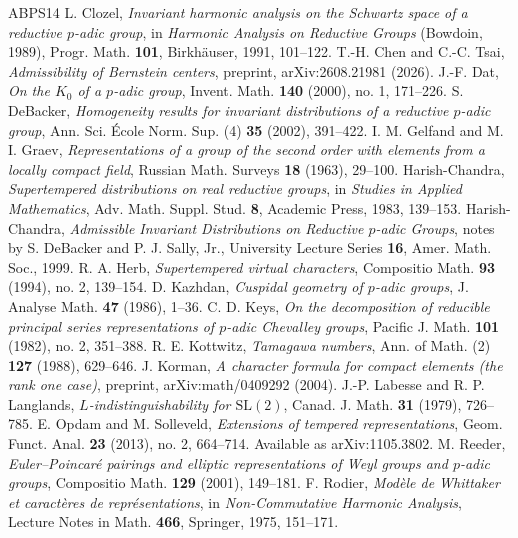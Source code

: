 \documentclass[12pt,letterpaper]{amsart}
\numberwithin{equation}{section}
\theoremstyle{definition}
\theoremstyle{remark}
\begin{document}
\begin{thebibliography}{ABPS14}
 L. Clozel, \emph{Invariant harmonic analysis on the Schwartz space of a reductive $p$-adic group}, in \emph{Harmonic Analysis on Reductive Groups} (Bowdoin, 1989), Progr. Math. \textbf{101}, Birkh\"auser, 1991, 101--122.
 T.-H. Chen and C.-C. Tsai, \emph{Admissibility of Bernstein centers}, preprint, arXiv:2608.21981 (2026).
 J.-F. Dat, \emph{On the $K_0$ of a $p$-adic group}, Invent. Math. \textbf{140} (2000), no. 1, 171--226.
 S. DeBacker, \emph{Homogeneity results for invariant distributions of a reductive $p$-adic group}, Ann. Sci. \'Ecole Norm. Sup. (4) \textbf{35} (2002), 391--422.
 I. M. Gelfand and M. I. Graev, \emph{Representations of a group of the second order with elements from a locally compact field}, Russian Math. Surveys \textbf{18} (1963), 29--100.
 Harish-Chandra, \emph{Supertempered distributions on real reductive groups}, in \emph{Studies in Applied Mathematics}, Adv. Math. Suppl. Stud. \textbf{8}, Academic Press, 1983, 139--153.
 Harish-Chandra, \emph{Admissible Invariant Distributions on Reductive $p$-adic Groups}, notes by S. DeBacker and P. J. Sally, Jr., University Lecture Series \textbf{16}, Amer. Math. Soc., 1999.
 R. A. Herb, \emph{Supertempered virtual characters}, Compositio Math. \textbf{93} (1994), no. 2, 139--154.
 D. Kazhdan, \emph{Cuspidal geometry of $p$-adic groups}, J. Analyse Math. \textbf{47} (1986), 1--36.
 C. D. Keys, \emph{On the decomposition of reducible principal series representations of $p$-adic Chevalley groups}, Pacific J. Math. \textbf{101} (1982), no. 2, 351--388.
 R. E. Kottwitz, \emph{Tamagawa numbers}, Ann. of Math. (2) \textbf{127} (1988), 629--646.
 J. Korman, \emph{A character formula for compact elements (the rank one case)}, preprint, arXiv:math/0409292 (2004).
 J.-P. Labesse and R. P. Langlands, \emph{$L$-indistinguishability for $\mathrm{SL}(2)$}, Canad. J. Math. \textbf{31} (1979), 726--785.
 E. Opdam and M. Solleveld, \emph{Extensions of tempered representations}, Geom. Funct. Anal. \textbf{23} (2013), no. 2, 664--714. Available as arXiv:1105.3802.
 M. Reeder, \emph{Euler--Poincar\'e pairings and elliptic representations of Weyl groups and $p$-adic groups}, Compositio Math. \textbf{129} (2001), 149--181.
 F. Rodier, \emph{Mod\`ele de Whittaker et caract\`eres de repr\'esentations}, in \emph{Non-Commutative Harmonic Analysis}, Lecture Notes in Math. \textbf{466}, Springer, 1975, 151--171.

\end{thebibliography}
\end{document}
